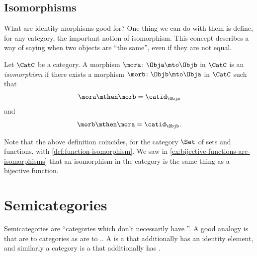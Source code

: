\subsection{Isomorphisms}

What are identity morphisms good for? One thing we can do with them is define, for any category, the important notion of isomorphism.
This concept describes a way of saying when two objects are ``the same'', even if they are not equal.

\begin{definition}\label{def:isomorphism}
    Let $\CatC$ be a category.
    A morphism $\mora \colon \Obja \mto \Objb$ in $\CatC$ is an \emph{isomorphism} if there exists a morphism $\morb \colon \Objb \mto \Obja$ in $\CatC$ such that
    \begin{equation}
        \mora \mthen \morb = \catid_\Obja
    \end{equation}
    and
    \begin{equation}
        \morb \mthen \mora = \catid_\Objb.
    \end{equation}
\end{definition}

\begin{remark}
    Note that the above definition coincides, for the category $\Set$ of sets and functions, with \cref{def:function-isomorphism}.
    We saw in \cref{ex:bijective-functions-are-isomorphisms} that an isomorphism in the category \Set is the same thing as a bijective function.
\end{remark}




\section{Semicategories}
\label{sec:formal-def-cats}

Semicategories are  ``categories which don't necessarily have ''.
A good analogy is that  are to categories as   are to ..
A  is a  that additionally has an identity element, and similarly a category is a  that additionally has .

